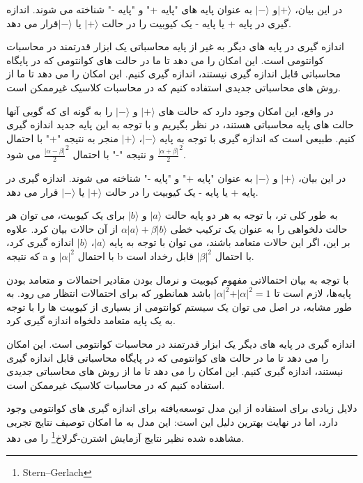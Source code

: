 \documentclass{book}
\begin{document}
در این بیان، $\vert+\rangle$و $\vert-\rangle$ به عنوان پایه های "پایه +" و "پایه -" شناخته می شوند. اندازه گیری در پایه + یا پایه - یک کیوبیت را در حالت $\vert+\rangle$ یا $\vert-\rangle$قرار می دهد.
 

اندازه گیری در پایه های دیگر به غیر از پایه محاسباتی یک ابزار قدرتمند در محاسبات کوانتومی است. این امکان را می دهد تا ما در حالت های کوانتومی که در پایگاه محاسباتی قابل اندازه گیری نیستند، اندازه گیری کنیم. این امکان را می دهد تا ما از روش های محاسباتی جدیدی استفاده کنیم که در محاسبات کلاسیک غیرممکن است.

در واقع، این امکان وجود دارد که حالت های $\vert+\rangle$ و $\vert-\rangle$ را به گونه ای که گویی آنها حالت های پایه محاسباتی هستند، در نظر بگیریم و با توجه به این پایه جدید اندازه گیری کنیم. طبیعی است که اندازه گیری با توجه به پایه $\vert-\rangle$، $\vert+\rangle$ منجر به نتیجه "+" با احتمال $\frac{\vert\alpha + \beta\vert}{2}^2$ و نتیجه "-" با احتمال $\frac{\vert\alpha - \beta\vert}{2}^2$ می شود.


در این بیان، $\vert+\rangle$ و $\vert-\rangle$ به عنوان "پایه +" و "پایه -" شناخته می شوند. اندازه گیری در پایه + یا پایه - یک کیوبیت را در حالت $\vert+\rangle$ یا $\vert-\rangle$ قرار می دهد.

به طور کلی تر، با توجه به هر دو پایه حالت $\vert a\rangle$ و $\vert b\rangle$ برای یک کیوبیت، می توان هر حالت دلخواهی را به عنوان یک ترکیب خطی $\alpha \vert a\rangle + \beta \vert b\rangle$ از آن حالات بیان کرد. علاوه بر این، اگر این حالات  متعامد باشند، می توان با توجه به پایه $\vert a\rangle$، $\vert b\rangle$ اندازه گیری کرد، که نتیجه a با احتمال $\vert\alpha\vert ^2$ و b با احتمال $\vert\beta\vert ^2$ قابل رخداد است.

با توجه به بیان احتمالاتی مفهوم کیوبیت و نرمال بودن مقادیر احتمالات و متعامد بودن پایه‌ها، لازم است تا $\vert\alpha\vert ^ 2 + \vert\alpha\vert ^ 2 = 1$ باشد همانطور که برای احتمالات انتظار می رود. به طور مشابه، در اصل می توان یک سیستم کوانتومی از بسیاری از کیوبیت ها را با توجه به یک پایه متعامد دلخواه اندازه گیری کرد.

اندازه گیری در پایه های دیگر یک ابزار قدرتمند در محاسبات کوانتومی است. این امکان را می دهد تا ما در حالت های کوانتومی که در پایگاه محاسباتی قابل اندازه گیری نیستند، اندازه گیری کنیم. این امکان را می دهد تا ما از روش های محاسباتی جدیدی استفاده کنیم که در محاسبات کلاسیک غیرممکن است.

دلایل زیادی برای استفاده از این مدل توسعه‌یافته برای اندازه گیری های کوانتومی وجود دارد، اما در نهایت بهترین دلیل این است: این مدل به ما امکان توصیف نتایج تجربی مشاهده شده نظیر نتایج آزمایش اشترن-گرلاخ\footnote{Stern–Gerlach} را می دهد.
\end{document}
